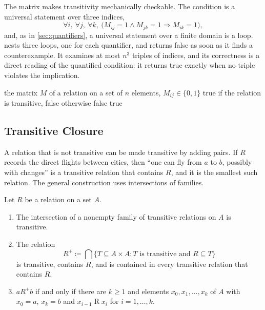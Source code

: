 The matrix makes transitivity mechanically checkable. The condition is a universal statement over three indices,
\[
\forall i,\ \forall j,\ \forall k,\ \bigl(M_{ij}=1\wedge M_{jk}=1\Rightarrow M_{ik}=1\bigr),
\]
and, as in \cref{sec:quantifiers}, a universal statement over a finite domain is a loop.  nests three loops, one for each quantifier, and returns false as soon as it finds a counterexample. It examines at most $n^3$ triples of indices, and its correctness is a direct reading of the quantified condition: it returns true exactly when no triple violates the implication.

\begin{algorithm}
\begin{algorithmic}[1]
\Require the matrix $M$ of a relation on a set of $n$ elements, $M_{ij}\in\{0,1\}$
\Ensure true if the relation is transitive, false otherwise
     
         
          \State \Return false
        \EndIf
      \EndFor
    \EndIf
  \EndFor
\EndFor
\State \Return true
\end{algorithmic}
\caption{Testing a relation for transitivity. The three loops correspond to the three universal quantifiers in the definition.}
\label{alg:transitive}
\end{algorithm}

\subsection{Transitive Closure}

A relation that is not transitive can be made transitive by adding pairs. If $R$ records the direct flights between cities, then ``one can fly from $a$ to $b$, possibly with changes'' is a transitive relation that contains $R$, and it is the smallest such relation. The general construction uses intersections of families.

\begin{proposition}
\label{prop:transitive-closure}
Let $R$ be a relation on a set $A$.
\begin{enumerate}
\item The intersection of a nonempty family of transitive relations on $A$ is transitive.
\item The relation
\[
R^+\coloneqq\bigcap\{T\subseteq A\times A: T\text{ is transitive and }R\subseteq T\}
\]
is transitive, contains $R$, and is contained in every transitive relation that contains $R$.
\item $a\mathrel{R^+}b$ if and only if there are $k\ge1$ and elements $x_0,x_1,\ldots,x_k$ of $A$ with $x_0=a$, $x_k=b$ and $x_{i-1}\mathrel{R}x_i$ for $i=1,\ldots,k$.
\end{enumerate}
\end{proposition}

